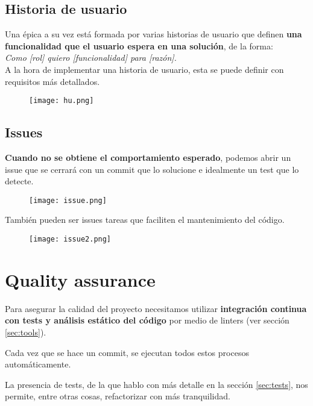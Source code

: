 \subsection{Historia de usuario}
Una épica a su vez está formada por varias historias de usuario que definen \textbf{una funcionalidad que el usuario espera en una solución}, de la forma:\\ \textit{Como [rol] quiero [funcionalidad] para [razón].}\\

A la hora de implementar una historia de usuario, esta se puede definir con requisitos más detallados.

\begin{figure}[H]
	\centering	
	\texttt{[image: hu.png]}
	\end{figure}

\subsection{Issues}
\textbf{Cuando no se obtiene el comportamiento esperado}, podemos abrir un issue que se cerrará con un commit que lo solucione e idealmente un test que lo detecte.

\begin{figure}[H]
	\centering	
	\texttt{[image: issue.png]}
	\end{figure}

	También pueden ser issues tareas que faciliten el mantenimiento del código.

\begin{figure}[H]
	\centering	
	\texttt{[image: issue2.png]}
	\end{figure}


\section{Quality assurance}

Para asegurar la calidad del proyecto necesitamos utilizar \textbf{integración continua con tests y análisis estático del código} por medio de linters (ver sección \ref{sec:tools}).


Cada vez que se hace un commit, se ejecutan todos estos procesos automáticamente.

La presencia de tests, de la que hablo con más detalle en la sección \ref{sec:tests}, nos permite, entre otras cosas, refactorizar con más 
tranquilidad. \\

